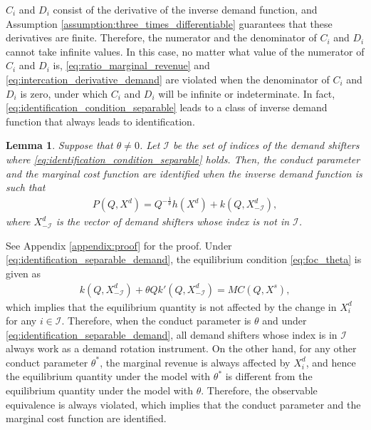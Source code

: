 \documentclass[11pt, a4paper]{article}
\newtheorem{lemma}{Lemma}
\theoremstyle{remark}
\begin{document}
$C_i$ and $D_i$ consist of the derivative of the inverse demand function, and Assumption \ref{assumption:three_times_differentiable} guarantees that these derivatives are finite.
Therefore, the numerator and the denominator of $C_i$ and $D_i$ cannot take infinite values.
In this case, no matter what value of the numerator of $C_i$ and $D_i$ is, \eqref{eq:ratio_marginal_revenue} and \eqref{eq:intercation_derivative_demand} are violated when the denominator of $C_i$ and $D_i$ is zero, under which $C_i$ and $D_i$ will be infinite or indeterminate.
In fact, \eqref{eq:identification_condition_separable} leads to a class of inverse demand function that always leads to identification.
\begin{lemma}\label{lemma:identification_condition_separable}
    Suppose that $\theta \ne 0$.  
    Let $\mathcal{I}$ be the set of indices of the demand shifters where \eqref{eq:identification_condition_separable} holds.
    Then, the conduct parameter and the marginal cost function are identified when the inverse demand function is such that
    \begin{align}
        P(Q, X^{d}) = Q^{-\frac{1}{\theta}}h(X^{d}) + k(Q, X^{d}_{-\mathcal{I}}), \label{eq:identification_separable_demand}
    \end{align}
    where $X^{d}_{-\mathcal{I}}$ is the vector of demand shifters whose index is not in $\mathcal{I}$.
\end{lemma}
See Appendix \ref{appendix:proof} for the proof.
Under \eqref{eq:identification_separable_demand}, the equilibrium condition \eqref{eq:foc_theta} is given as
\begin{align}
    k(Q, X^{d}_{-\mathcal{I}}) + \theta Qk'(Q, X^{d}_{-\mathcal{I}}) = MC(Q, X^{s}),
\end{align}
which implies that the equilibrium quantity is not affected by the change in $X^{d}_i$ for any $i \in \mathcal{I}$.
Therefore, when the conduct parameter is $\theta$ and under \eqref{eq:identification_separable_demand}, all demand shifters whose index is in $\mathcal{I}$ always work as a demand rotation instrument.
On the other hand, for any other conduct parameter $\theta^{*}$, the marginal revenue is always affected by $X^{d}_i$, and hence the equilibrium quantity under the model with $\theta^{*}$ is different from the equilibrium quantity under the model with $\theta$.
Therefore, the observable equivalence is always violated, which implies that the conduct parameter and the marginal cost function are identified.
\end{document}
